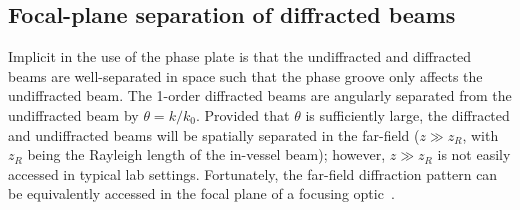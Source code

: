 \subsection{Focal-plane separation of diffracted beams}
Implicit in the use of the phase plate
is that the undiffracted and diffracted beams
are well-separated in space
such that the phase groove only affects the undiffracted beam.
The 1-order diffracted beams are angularly separated
from the undiffracted beam by $\theta = k / k_0$.
\graffito{\textcolor{red}{Sufficiently large: $k w_0 \gtrsim 2$?}}
Provided that $\theta$ is sufficiently large,
the diffracted and undiffracted beams
will be spatially separated in the far-field
($z \gg z_R$, with $z_R$ being the Rayleigh length of the in-vessel beam);
however, $z \gg z_R$ is not easily accessed in typical lab settings.
Fortunately, the far-field diffraction pattern
can be equivalently accessed in the focal plane
\graffito{\textcolor{red}{Chapter???}}
of a focusing optic~\cite{born_and_wolf}.


